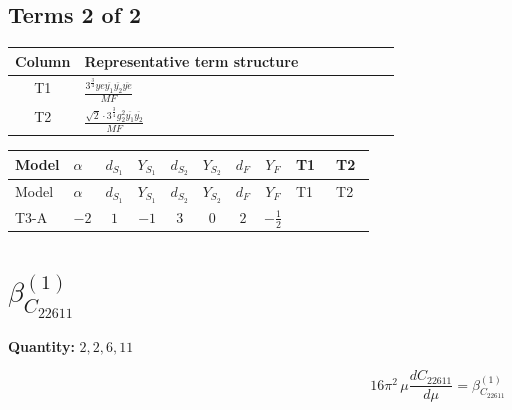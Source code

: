 \documentclass[8pt]{article}
\begin{document}
\begin{landscape}
\subsection*{Terms 2 of 2}
\begin{center}
\begin{tabular}{@{}c >{\raggedright\arraybackslash}p{0.82\linewidth}@{}}
\toprule
Column & Representative term structure \\
\midrule
T1 & \(\displaystyle \frac{3^{\frac{3}{4}} ye \overline{y_{1}} \overline{y_{2}} \overline{ye}}{MF}\) \\
\midrule
T2 & \(\displaystyle \frac{\sqrt{2} \cdot 3^{\frac{3}{4}} g_{2}^{2} \overline{y_{1}} \overline{y_{2}}}{MF}\) \\
\midrule
\bottomrule
\end{tabular}
\end{center}
\smallskip
\tiny
\begin{longtable}{@{}llcccccc >{\raggedright\arraybackslash}p{0.21\linewidth} >{\raggedright\arraybackslash}p{0.21\linewidth}@{}}
\toprule
Model & $\alpha$ & $d_{S_1}$ & $Y_{S_1}$ & $d_{S_2}$ & $Y_{S_2}$ & $d_F$ & $Y_F$ & T1 & T2 \\
\midrule
\endfirsthead
\toprule
Model & $\alpha$ & $d_{S_1}$ & $Y_{S_1}$ & $d_{S_2}$ & $Y_{S_2}$ & $d_F$ & $Y_F$ & T1 & T2 \\
\midrule
\endhead
T3-A & $-2$ & $1$ & $-1$ & $3$ & $0$ & $2$ & $-\frac{1}{2}$ & \scriptsize\adjustbox{max width=\linewidth}{$\begin{gathered} - \frac{3^{\frac{3}{4}} ye \overline{y_{1}} \overline{y_{2}} \overline{ye}}{12 MF}\end{gathered}$} & \scriptsize\adjustbox{max width=\linewidth}{$\begin{gathered} \frac{\sqrt{2} \cdot 3^{\frac{3}{4}} g_{2}^{2} \overline{y_{1}} \overline{y_{2}}}{3 MF}\end{gathered}$} \\
\midrule
\bottomrule
\end{longtable}
\clearpage
\section*{$\beta_{C_{22611}}^{(1)}$}
\noindent\textbf{Quantity: }$\mathrm{2,2,6,11}$\par\smallskip
\[16\pi^2\,\mu\frac{d C_{22611}}{d\mu}=\beta_{C_{22611}}^{(1)}\]

\end{landscape}
\end{document}
